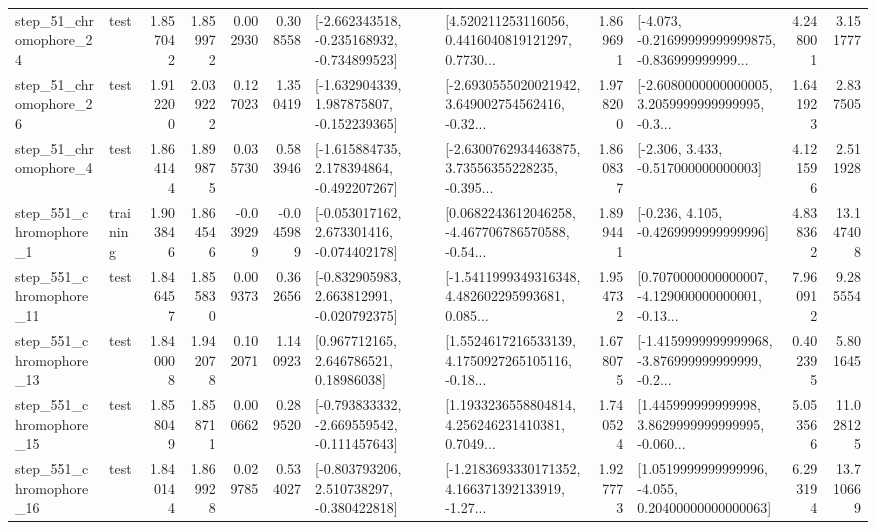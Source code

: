 \begin{tabular}{llrrrrllrlrr}
   step\_51\_chromophore\_24 &      test &      1.857042 &    1.859972 &      0.002930 &  0.308558 &  [-2.662343518, -0.235168932, -0.734899523] &  [4.520211253116056, 0.4416040819121297, 0.7730... &       1.869691 &  [-4.073, -0.21699999999999875, -0.836999999999... &            4.248001 &          3.151777 \\
   step\_51\_chromophore\_26 &      test &      1.912200 &    2.039222 &      0.127023 &  1.350419 &   [-1.632904339, 1.987875807, -0.152239365] &  [-2.6930555020021942, 3.649002754562416, -0.32... &       1.978200 &  [-2.6080000000000005, 3.2059999999999995, -0.3... &            1.641923 &          2.837505 \\
    step\_51\_chromophore\_4 &      test &      1.864144 &    1.899875 &      0.035730 &  0.583946 &   [-1.615884735, 2.178394864, -0.492207267] &  [-2.6300762934463875, 3.73556355228235, -0.395... &       1.860837 &                [-2.306, 3.433, -0.517000000000003] &            4.121596 &          2.511928 \\
   step\_551\_chromophore\_1 &  training &      1.903846 &    1.864546 &     -0.039299 & -0.045989 &   [-0.053017162, 2.673301416, -0.074402178] &  [0.0682243612046258, -4.467706786570588, -0.54... &       1.899441 &               [-0.236, 4.105, -0.4269999999999996] &            4.838362 &         13.147408 \\
  step\_551\_chromophore\_11 &      test &      1.846457 &    1.855830 &      0.009373 &  0.362656 &   [-0.832905983, 2.663812991, -0.020792375] &  [-1.5411999349316348, 4.482602295993681, 0.085... &       1.954732 &  [0.7070000000000007, -4.129000000000001, -0.13... &            7.960912 &          9.285554 \\
  step\_551\_chromophore\_13 &      test &      1.840008 &    1.942078 &      0.102071 &  1.140923 &      [0.967712165, 2.646786521, 0.18986038] &  [1.5524617216533139, 4.1750927265105116, -0.18... &       1.678075 &  [-1.4159999999999968, -3.876999999999999, -0.2... &            0.402395 &          5.801645 \\
  step\_551\_chromophore\_15 &      test &      1.858049 &    1.858711 &      0.000662 &  0.289520 &  [-0.793833332, -2.669559542, -0.111457643] &  [1.1933236558804814, 4.256246231410381, 0.7049... &       1.740524 &  [1.445999999999998, 3.8629999999999995, -0.060... &            5.053566 &         11.028125 \\
  step\_551\_chromophore\_16 &      test &      1.840144 &    1.869928 &      0.029785 &  0.534027 &   [-0.803793206, 2.510738297, -0.380422818] &  [-1.2183693330171352, 4.166371392133919, -1.27... &       1.927773 &  [1.0519999999999996, -4.055, 0.20400000000000063] &            6.293194 &         13.710669 \\

\end{tabular}
